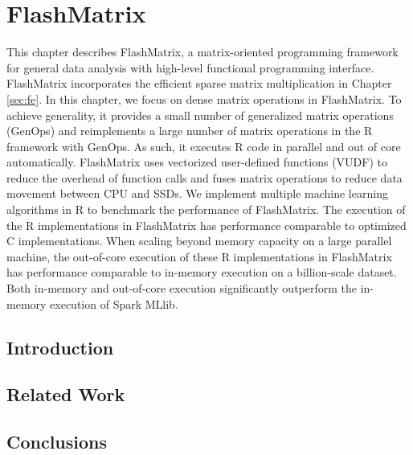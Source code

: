 \chapter{FlashMatrix}
\label{sec:fm}

This chapter describes FlashMatrix, a matrix-oriented programming framework
for general data analysis with high-level functional programming interface.
FlashMatrix incorporates the efficient sparse matrix multiplication in Chapter
\ref{sec:fe}. In this chapter, we focus on dense matrix operations in FlashMatrix.
To achieve generality, it provides a small number of generalized matrix
operations (GenOps) and reimplements a large number of matrix operations in
the R framework with GenOps. As such, it executes R code in parallel and out of
core automatically. FlashMatrix
uses vectorized user-defined functions (VUDF) to reduce the overhead of function
calls and fuses matrix operations to reduce data movement between CPU and
SSDs. We implement multiple machine learning algorithms in R to benchmark
the performance of FlashMatrix. The execution of the R implementations in
FlashMatrix has performance comparable to optimized C implementations.
When scaling beyond memory capacity on a large parallel machine, the out-of-core
execution of these R implementations in FlashMatrix has performance comparable
to in-memory execution on a billion-scale dataset. Both in-memory and
out-of-core execution significantly outperform the in-memory execution of
Spark MLlib.

\section{Introduction}


\section{Related Work}






\section{Conclusions}

